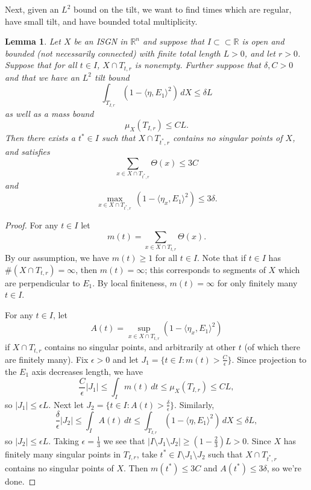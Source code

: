\documentclass[11pt,reqno,twoside]{amsart}
\newtheorem{lemma}{Lemma}
\theoremstyle{definition}
\begin{document}
Next, given an $L^2$ bound on the tilt, we want to find times which are regular, have small tilt, and have bounded total multiplicity. 

\begin{lemma} \label{find-point}
    Let $X$ be an ISGN in $\mathbb{R}^n$ and suppose that $I \subset\subset \mathbb{R}$ is open and bounded (not necessarily connected) with finite total length $L > 0$, and let $r > 0$. Suppose that for all $t \in I$, $X \cap T_{t,r}$ is nonempty. Further suppose that $\delta,C > 0$ and that we have an $L^2$ tilt bound
    \[\int_{T_{I,r}} (1 - \langle \eta,E_1\rangle^2) \, dX \leq \delta L\]
    as well as a mass bound
    \[\mu_X(T_{I,r}) \leq CL.\]
    Then there exists a $t^* \in I$ such that $X \cap T_{t^*,r}$ contains no singular points of $X$, and satisfies
    \[\sum_{x \in X \cap T_{t^*,r}} \Theta(x) \leq 3C\]
    and
    \[\max_{x \in X \cap T_{t^*,r}} \, (1 - \langle \eta_x, E_1\rangle^2) \leq 3\delta.\]
\end{lemma}

\begin{proof}
    For any $t \in I$ let
    \[m(t) = \sum_{x \in X \cap T_{t,r}} \Theta(x).\]
    By our assumption, we have $m(t) \geq 1$ for all $t \in I$. Note that if $t \in I$ has $ \#(X \cap T_{t,r}) = \infty$, then $m(t) = \infty$; this corresponds to segments of $X$ which are perpendicular to $E_1$. By local finiteness, $m(t) = \infty$ for only finitely many $t \in I$.
    
    For any $t \in I$, let
    \[A(t) = \sup_{x \in X \cap T_{t,r}} (1 - \langle \eta_x,E_1\rangle^2)\]
    if $X \cap T_{t,r}$ contains no singular points, and arbitrarily at other $t$ (of which there are finitely many).
    Fix $\epsilon > 0$ and let $J_1 = \{t \in I: m(t) > \frac{C}{\epsilon}\}.$ Since projection to the $E_1$ axis decreases length, we have
    \[\frac{C}{\epsilon}|J_1| \leq \int_{I} m(t) \, dt \leq \mu_X(T_{I,r}) \leq CL,\]
    so $|J_1| \leq \epsilon L$. Next let $J_2 = \{t \in I: A(t) > \frac{\delta}{\epsilon}\}.$ Similarly,
    \[\frac{\delta}{\epsilon}|J_2| \leq \int_{I} A(t) \, dt \leq \int_{T_{I,r}} (1 - \langle \eta,E_1\rangle^2) \, dX \leq \delta L,\]
    so $|J_2| \leq \epsilon L$. Taking $\epsilon = \frac{1}{3}$ we see that $|I \setminus J_1 \setminus J_2| \geq (1-\frac{2}{3})L > 0$. Since $X$ has finitely many singular points in $T_{I,r}$, take $t^* \in I \setminus J_1 \setminus J_2$ such that $X \cap T_{t^*,r}$ contains no singular points of $X$. Then $m(t^*) \leq 3C $ and $A(t^*) \leq 3\delta$, so we're done.
\end{proof}
\end{document}
